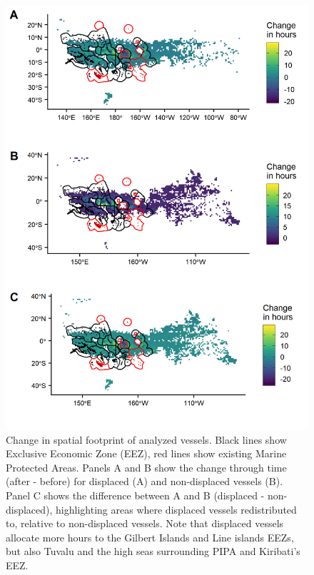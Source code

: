 \documentclass[9p,twocolumn,twoside,lineno]{pnas-new}
\begin{document}
\begin{figure}[H]
\centering
\includegraphics{img/fishing_raster_diff.png}
\caption{\label{fig:fishing_raster_diff}Change in spatial footprint of analyzed vessels. Black lines show Exclusive Economic Zone (EEZ), red lines show existing Marine Protected Areas. Panels A and B show the change through time (after - before) for displaced (A) and non-displaced vessels (B). Panel C shows the difference between A and B (displaced - non-displaced), highlighting areas where displaced vessels redistributed to, relative to non-displaced vessels. Note that displaced vessels allocate more hours to the Gilbert Islands and Line islands EEZs, but also Tuvalu and the high seas surrounding PIPA and Kiribati's EEZ.}
\end{figure}
\end{document}
